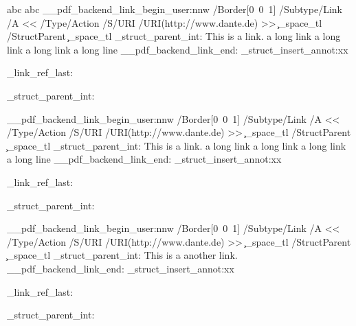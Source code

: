 \documentclass{article}
\begin{document}
\leavevmode
{}
abc
\tagmcend
{}
abc
\tagmcend
{}
\ExplSyntaxOn\makeatletter
\leavevmode\__pdf_backend_link_begin_user:nnw
     {/Border[0~0~1]}
     {
          /Subtype/Link%
          /A
           <<
            /Type/Action
            /S/URI
            /URI(http://www.dante.de)
           >>
         \c_space_tl
         /StructParent \c_space_tl
         \tag_struct_parent_int:
     }
    This is a link. a long link a long link a long link a long line
\__pdf_backend_link_end:
 \tag_struct_insert_annot:xx {\pdfannot_link_ref_last:}{\tag_struct_parent_int:}
\ExplSyntaxOff
\tagmcend
\tagstructend

\ExplSyntaxOn\makeatletter
\leavevmode\__pdf_backend_link_begin_user:nnw
     {/Border[0~0~1]}
     {
          /Subtype/Link%
          /A
           <<
            /Type/Action
            /S/URI
            /URI(http://www.dante.de)
           >>
         \c_space_tl
         /StructParent \c_space_tl
         \tag_struct_parent_int:
     }
    This is a link. a long link a long link a long link a long line
\__pdf_backend_link_end:
\tag_struct_insert_annot:xx {\pdfannot_link_ref_last:}{\tag_struct_parent_int:}

\ExplSyntaxOff
\tagmcend
\tagstructend

\ExplSyntaxOn\makeatletter
\leavevmode\__pdf_backend_link_begin_user:nnw
    {/Border[0~0~1]}
    {
          /Subtype/Link%
          /A
           <<
            /Type/Action
            /S/URI
            /URI(http://www.dante.de)
           >>
         \c_space_tl
         /StructParent \c_space_tl \tag_struct_parent_int: %
    }
    This is a another link.
\__pdf_backend_link_end:
 \tag_struct_insert_annot:xx {\pdfannot_link_ref_last:}{\tag_struct_parent_int:}
 
\ExplSyntaxOff
\tagmcend
\tagstructend
\tagstructend
\tagstructend
\end{document}

